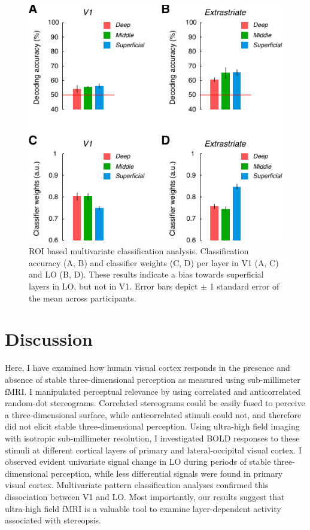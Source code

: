 \begin{figure}
  \centering
  \includegraphics[keepaspectratio]{Fig6}
  \caption[ROI based multivariate classification analysis.]{ROI based multivariate classification analysis. Classification accuracy (A, B) and classifier weights (C, D) per layer in V1 (A, C) and LO (B, D). These results indicate a bias towards superficial layers in LO, but not in V1. Error bars depict $\pm$ 1 standard error of the mean across participants.}
  \label{fig:ch5fig6}
\end{figure}


\section{Discussion}

Here, I have examined how human visual cortex responds in the presence and absence of stable three-dimensional perception as measured using sub-millimeter fMRI. I manipulated perceptual relevance by using correlated and anticorrelated random-dot stereograms. Correlated stereograms could be easily fused to perceive a three-dimensional surface, while anticorrelated stimuli could not, and therefore did not elicit stable three-dimensional perception. Using ultra-high field imaging with isotropic sub-millimeter resolution, I investigated BOLD responses to these stimuli at different cortical layers of primary and lateral-occipital visual cortex. I observed evident univariate signal change in LO during periods of stable three-dimensional perception, while less differential signals were found in primary visual cortex. Multivariate pattern classification analyses confirmed this dissociation between V1 and LO. Most importantly, our results suggest that ultra-high field fMRI is a valuable tool to examine layer-dependent activity associated with stereopsis.


